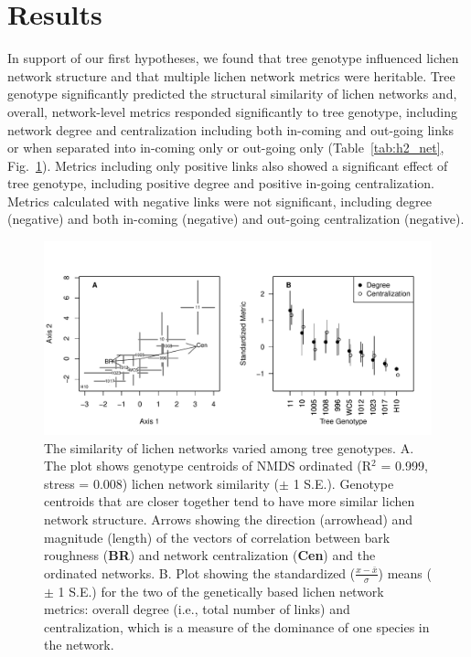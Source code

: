 \documentclass[fleqn,12pt]{olplainarticle}
\begin{document}
\section*{Results}

In support of our first hypotheses, we found that tree genotype
influenced lichen network structure and that multiple lichen network
metrics were heritable. Tree genotype significantly predicted the
structural similarity of lichen networks and, overall, network-level
metrics responded significantly to tree genotype, including network
degree and centralization including both in-coming and out-going links
or when separated into in-coming only or out-going only
(Table~\ref{tab:h2_net}, Fig.~\ref{fig:h2_plot}).  Metrics including
only positive links also showed a significant effect of tree genotype,
including positive degree and positive in-going centralization.
Metrics calculated with negative links were not significant, including
degree (negative) and both in-coming (negative) and out-going
centralization (negative).

\begin{figure}[ht]
\centering
\includegraphics[width=\linewidth]{figures/h2_plot.pdf}
\caption{The similarity of lichen networks varied among tree
  genotypes. A. The plot shows genotype centroids of NMDS ordinated
  (R$^2$ = 0.999, stress = 0.008) lichen network similarity ($\pm$ 1
  S.E.). Genotype centroids that are closer together tend to have more
  similar lichen network structure. Arrows showing the direction
  (arrowhead) and magnitude (length) of the vectors of correlation
  between bark roughness (\textbf{BR}) and network centralization
  (\textbf{Cen}) and the ordinated networks. B. Plot showing
  the standardized ($\frac{x - \bar{x}}{\sigma}$) means ($\pm$ 1 S.E.)
  for the two of the genetically based lichen network metrics: overall
  degree (i.e., total number of links) and centralization, which is a
  measure of the dominance of one species in the network.}
\label{fig:h2_plot}
\end{figure}
\end{document}
